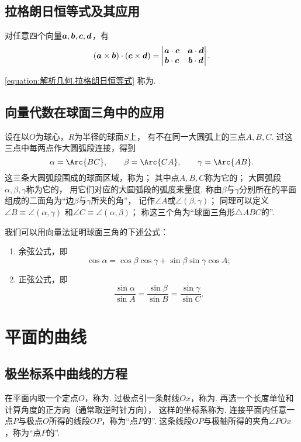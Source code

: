 \subsection{拉格朗日恒等式及其应用}
\begin{theorem}
对任意四个向量\(\boldsymbol{a},\boldsymbol{b},\boldsymbol{c},\boldsymbol{d}\)，有
\begin{equation}\label{equation:解析几何.拉格朗日恒等式}
	(\boldsymbol{a}\times\boldsymbol{b})\cdot(\boldsymbol{c}\times\boldsymbol{d})
	= \begin{vmatrix}
		\boldsymbol{a}\cdot\boldsymbol{c} & \boldsymbol{a}\cdot\boldsymbol{d} \\
		\boldsymbol{b}\cdot\boldsymbol{c} & \boldsymbol{b}\cdot\boldsymbol{d}
	\end{vmatrix}.
\end{equation}
\end{theorem}
\cref{equation:解析几何.拉格朗日恒等式}
称为.

\subsection{向量代数在球面三角中的应用}
设在以\(O\)为球心，\(R\)为半径的球面\(S\)上，
有不在同一大圆弧上的三点\(A,B,C\).
过这三点中每两点作大圆弧段连接，得到\[
	\alpha=\Arc{BC}, \qquad
	\beta=\Arc{CA}, \qquad
	\gamma=\Arc{AB}.
\]
这三条大圆弧段围成的球面区域，称为；
其中点\(A,B,C\)称为它的；
大圆弧段\(\alpha,\beta,\gamma\)称为它的，
用它们对应的大圆弧段的弧度来量度.
称由\(\beta\)与\(\gamma\)分别所在的平面组成的二面角为“边\(\beta\)与\(\gamma\)所夹的角”，
记作\(\angle A\)或\(\angle(\beta,\gamma)\)；
同理可以定义\(\angle B \equiv \angle(\alpha,\gamma)\)
和\(\angle C \equiv \angle(\alpha,\beta)\)；
称这三个角为“球面三角形\(\triangle ABC\)的”.

我们可以用向量法证明球面三角的下述公式：
\begin{enumerate}
	\item 余弦公式，即\[
		\cos\alpha = \cos\beta \cos\gamma + \sin\beta \sin\gamma \cos A;
	\]
	\item 正弦公式，即\[
		\frac{\sin\alpha}{\sin A}
		= \frac{\sin\beta}{\sin B}
		= \frac{\sin\gamma}{\sin C}.
	\]
\end{enumerate}

\section{平面的曲线}
\subsection{极坐标系中曲线的方程}
在平面内取一个定点\(O\)，称为.
过极点引一条射线\(Ox\)，称为.
再选一个长度单位和计算角度的正方向（通常取逆时针方向），
这样的坐标系称为.
连接平面内任意一点\(P\)与极点\(O\)所得的线段\(OP\)，称为“点\(P\)的”.
这条线段\(OP\)与极轴所得的夹角\(\angle POx\)，称为“点\(P\)的”.

